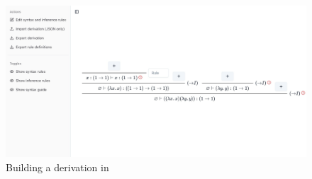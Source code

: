 \begin{figure}[!htbp]
    \centering
    \includegraphics[width=\textwidth]{introduction/builder.png}
    \caption{Building a derivation in \projectname{}}
    \label{fig:introduction:builder}
\end{figure}